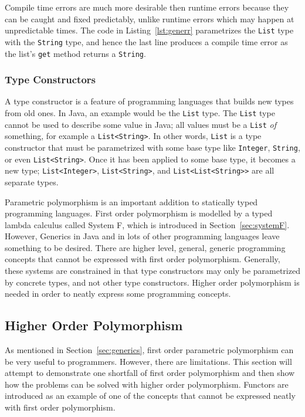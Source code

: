 Compile time errors are much more desirable then runtime errors because they
can be caught and fixed predictably, unlike runtime errors which may happen at
unpredictable times. The code in Listing~\ref{lst:generr} parametrizes the
\lstinline{List} type with the \lstinline{String} type, and hence the last line
produces a compile time error as the list's \lstinline{get} method returns a
\lstinline{String}. 

\subsubsection{Type Constructors}
A type constructor is a feature of programming languages that builds new types
from old ones. In Java, an example would be the \lstinline{List} type. The
\lstinline{List} type cannot be used to describe some value in Java; all values
must be a \lstinline{List} \textit{of} something, for example a
\lstinline{List<String>}.  In other words, \lstinline{List} is a type
constructor that must be parametrized with some base type like
\lstinline{Integer}, \lstinline{String}, or even \lstinline{List<String>}. Once
it has been applied to some base type, it becomes a new type;
\lstinline{List<Integer>}, \lstinline{List<String>}, and
\lstinline{List<List<String>>} are all separate types.

Parametric polymorphism is an important addition to statically typed
programming languages. First order polymorphism is modelled by a typed lambda
calculus called System F, which is introduced in Section~\ref{sec:systemF}.
However, Generics in Java and in lots of other programming languages leave
something to be desired.  There are higher level, general, generic programming
concepts that cannot be expressed with first order polymorphism. Generally,
these systems are constrained in that type constructors may only be
parametrized by concrete types, and not other type constructors. Higher order
polymorphism is needed in order to neatly express some programming concepts.

\subsection{Higher Order Polymorphism}
As mentioned in Section~\ref{sec:generics}, first order parametric polymorphism
can be very useful to programmers.  However, there are limitations. This
section will attempt to demonstrate one shortfall of first order polymorphism
and then show how the problems can be solved with higher order polymorphism.
Functors are introduced as an example of one of the concepts that cannot be
expressed neatly with first order polymorphism.

